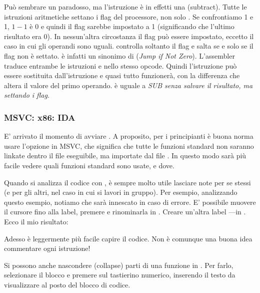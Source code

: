 \label{CMPandSUB}
Può sembrare un paradosso, ma l'istruzione \CMP è in effetti una \SUB (subtract).
Tutte le istruzioni aritmetiche settano i flag del processore, non solo \CMP.
Se confrontiamo 1 e 1, $1-1$ è 0 e quindi il flag \ZF sarebbe impostato a 1 (significando che l'ultimo risultato era 0).
In nessun'altra circostanza il flag \ZF può essere impostato, eccetto il caso in cui gli operandi sono uguali.
\JNE controlla soltanto il flag \ZF e salta se e solo se il flag non è settato.  \JNE è infatti un sinonimo di \JNZ (\emph{Jump if Not Zero}).
L'assembler traduce entrambe le istruzioni \JNE e \JNZ nello stesso opcode.
Quindi l'istruzione \CMP può essere sostituita dall'istruzione \SUB e quasi tutto funzionerà, con la differenza che \SUB altera il valore del primo operando.
\CMP è uguale a \emph{SUB senza salvare il risultato, ma settando i flag}.

\subsubsection{MSVC: x86: IDA}

E' arrivato il momento di avviare \IDA. A proposito, per i principianti è buona norma usare l'opzione  in MSVC, che significa che tutte le funzioni
standard non saranno linkate dentro il file eseguibile, ma importate dal file .
In questo modo sarà più facile vedere quali funzioni standard sono usate, e dove.

Quando si analizza il codice con \IDA, è sempre molto utile lasciare note per se stessi (e per gli altri, nel caso in cui si lavori in gruppo).
Per esempio, analizzando questo esempio, notiamo che 
 sarà innescato in caso di errore.
E' possibile muovere il cursore fino alla label, premere  e rinominarla in .
Creare un'altra label ---in .
Ecco il mio risultato:



Adesso è leggermente più facile capire il codice.
Non è comunque una buona idea commentare ogni istruzione!

Si possono anche nascondere (collapse) parti di una funzione in \IDA.
Per farlo, selezionare il blocco e premere \q{--} sul tastierino numerico, inserendo il testo da visualizzare al posto del blocco di codice.

